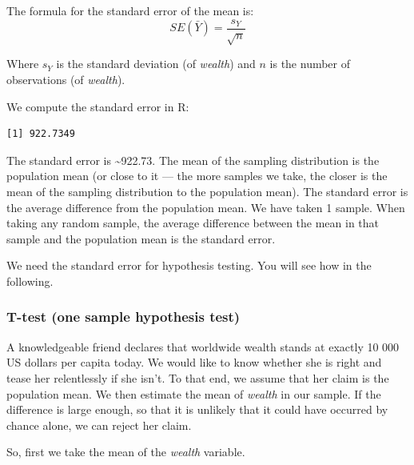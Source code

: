 \documentclass[]{article}
\newenvironment{Shaded}{\begin{snugshade}}{\end{snugshade}}
\newcommand{\KeywordTok}[1]{\textcolor[rgb]{0.13,0.29,0.53}{\textbf{#1}}}
\newcommand{\StringTok}[1]{\textcolor[rgb]{0.31,0.60,0.02}{#1}}
\newcommand{\OperatorTok}[1]{\textcolor[rgb]{0.81,0.36,0.00}{\textbf{#1}}}
\newcommand{\NormalTok}[1]{#1}
\theoremstyle{definition}
\theoremstyle{definition}
\theoremstyle{definition}
\theoremstyle{remark}
\begin{document}
The formula for the standard error of the mean is:
\[ SE(\bar{Y}) = \frac{s_Y}{\sqrt{n}}  \]

Where \(s_Y\) is the standard deviation (of \emph{wealth}) and \(n\) is
the number of observations (of \emph{wealth}).

We compute the standard error in R:

\begin{Shaded}
\end{Shaded}

\begin{verbatim}
[1] 922.7349
\end{verbatim}

The standard error is \textasciitilde{}922.73. The mean of the sampling
distribution is the population mean (or close to it --- the more samples
we take, the closer is the mean of the sampling distribution to the
population mean). The standard error is the average difference from the
population mean. We have taken 1 sample. When taking any random sample,
the average difference between the mean in that sample and the
population mean is the standard error.

We need the standard error for hypothesis testing. You will see how in
the following.

\subsubsection{T-test (one sample hypothesis
test)}\label{t-test-one-sample-hypothesis-test}

A knowledgeable friend declares that worldwide wealth stands at exactly
10 000 US dollars per capita today. We would like to know whether she is
right and tease her relentlessly if she isn't. To that end, we assume
that her claim is the population mean. We then estimate the mean of
\emph{wealth} in our sample. If the difference is large enough, so that
it is unlikely that it could have occurred by chance alone, we can
reject her claim.

So, first we take the mean of the \emph{wealth} variable.

\begin{Shaded}
\end{Shaded}
\end{document}
